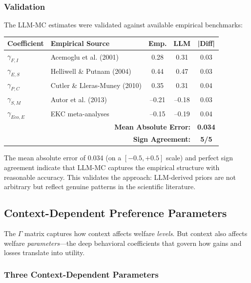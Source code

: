 \subsubsection{Validation}

The LLM-MC estimates were validated against available empirical benchmarks:

\begin{center}
\small
\begin{tabular}{llccc}
\hline
\textbf{Coefficient} & \textbf{Empirical Source} & \textbf{Emp.} & \textbf{LLM} & \textbf{|Diff|} \\
\hline
$\gamma_{F,I}$ & Acemoglu et al. (2001) & 0.28 & 0.31 & 0.03 \\
$\gamma_{E,S}$ & Helliwell \& Putnam (2004) & 0.44 & 0.47 & 0.03 \\
$\gamma_{P,C}$ & Cutler \& Lleras-Muney (2010) & 0.35 & 0.31 & 0.04 \\
$\gamma_{S,M}$ & Autor et al. (2013) & --0.21 & --0.18 & 0.03 \\
$\gamma_{Eco,E}$ & EKC meta-analyses & --0.15 & --0.19 & 0.04 \\
\hline
\multicolumn{4}{r}{\textbf{Mean Absolute Error:}} & \textbf{0.034} \\
\multicolumn{4}{r}{\textbf{Sign Agreement:}} & \textbf{5/5}} \\
\hline
\end{tabular}
\end{center}

The mean absolute error of 0.034 (on a $[-0.5, +0.5]$ scale) and perfect sign agreement
indicate that LLM-MC captures the empirical structure with reasonable accuracy.
This validates the approach: LLM-derived priors are not arbitrary but reflect
genuine patterns in the scientific literature.

\subsection{Context-Dependent Preference Parameters}

The $\Gamma$ matrix captures how context affects welfare \emph{levels}.
But context also affects welfare \emph{parameters}---the deep behavioral coefficients
that govern how gains and losses translate into utility.

\subsubsection{Three Context-Dependent Parameters}

